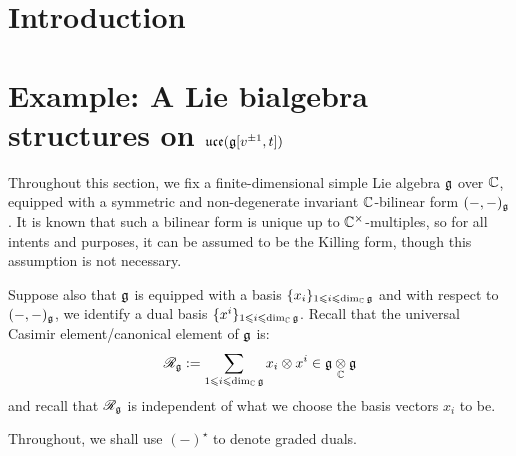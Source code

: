 

\setcounter{section}{-1}





    \title{}
    
    \author{Dat Minh Ha}
    \maketitle
    
    \begin{abstract}
    
    \end{abstract}
    
    {
    \hypersetup{} 
    \tableofcontents %
    \listoftodos
    }

    \section{Introduction}

    \section{Example: A Lie bialgebra structures on \texorpdfstring{$\mathfrak{uce}( \mathfrak{g}[v^{\pm 1}, t] )$}{}}
        \begin{convention} \label{conv: a_fixed_finite_dimensional_simple_lie_algebra}
            Throughout this section, we fix a finite-dimensional simple Lie algebra $\mathfrak{g}$ over $\mathbb{C}$, equipped with a symmetric and non-degenerate invariant $\mathbb{C}$-bilinear form $(-, -)_{\mathfrak{g}}$. It is known that such a bilinear form is unique up to $\bbC^{\x}$-multiples, so for all intents and purposes, it can be assumed to be the Killing form, though this assumption is not necessary. 

            Suppose also that $\mathfrak{g}$ is equipped with a basis $\{x_i\}_{1 \leqslant i \leqslant \dim_{\mathbb{C}} \mathfrak{g}}$ and with respect to $(-, -)_{\mathfrak{g}}$, we identify a dual basis $\{x^i\}_{1 \leqslant i \leqslant \dim_{\mathbb{C}} \mathfrak{g}}$. Recall that the universal Casimir element/canonical element of $\mathfrak{g}$ is:
                $$\scrR_{\g} := \sum_{1 \leq i \leq \dim_{\bbC} \g} x_i \tensor x^i \in \g \tensor_{\bbC} \g$$
            and recall that $\mathscr{R}_{\mathfrak{g}}$ is independent of what we choose the basis vectors $x_i$ to be.
        \end{convention}

        \begin{convention}
            Throughout, we shall use $(-)^{\star}$ to denote graded duals. 
        \end{convention}

